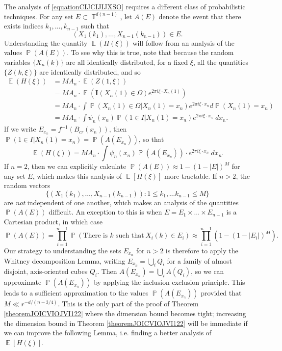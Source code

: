 \documentclass[dvipsnames,letterpaper,12pt]{article}
\numberwithin{equation}{section}
\DeclareMathOperator{\TT}{\mathbb{T}}
\numberwithin{theorem}{section}
\DeclareMathOperator{\EE}{\mathbb{E}}
\DeclareMathOperator{\PP}{\mathbb{P}}
\begin{document}
The analysis of \eqref{equationCIJCIJIJXSO} requires a different class of probabilistic techniques. For any set $E \subset \TT^{d(n-1)}$, let $A(E)$ denote the event that there exists indices $k_1,\dots, k_{n-1}$ such that
%
\[ (X_1(k_1), \dots, X_{n-1}(k_{n-1})) \in E. \]
%
Understanding the quantity $\EE(H(\xi))$ will follow from an analysis of the values $\PP(A(E))$. To see why this is true, note that because the random variables $\{ X_n(k) \}$ are all identically distributed, for a fixed $\xi$, all the quantities $\{ Z(k,\xi) \}$ are identically distributed, and so
%
\begin{align*}
    \EE(H(\xi)) &= M A_n \cdot \EE(Z(1,\xi))\\
    &= M A_n \cdot \EE( \mathbf{I}(X_n(1) \in \Omega) e^{2 \pi i \xi \cdot X_n(1)} )\\
    &= M A_n \cdot \int \PP(X_n(1) \in \Omega | X_n(1) = x_n) e^{2 \pi i \xi \cdot x_n} d\PP(X_n(1) = x_n)\\
    &= M A_n \cdot \int \psi_n(x_n) \PP(1 \in I | X_n(1) = x_n) e^{2 \pi i \xi \cdot x_n}\; dx_n.
\end{align*}
%
If we write $E_{x_n} = f^{-1}(B_{cr}(x_n))$, then $\PP(1 \in I | X_n(1) = x_n) = \PP(A(E_{x_n}))$, so that
%
\begin{equation} \label{ejowiajeoijo1ij2312j}
    \EE(H(\xi)) = MA_n \cdot \int \psi_n(x_n) \PP(A(E_{x_n})) \cdot e^{2 \pi i \xi \cdot x_n}\; dx_n.
\end{equation}
%
If $n = 2$, then we can explicitly calculate $\PP(A(E)) \approx 1 - (1 - |E|)^M$ for any set $E$, which makes this analysis of $\EE[H(\xi)]$ more tractable. If $n > 2$, the random vectors
%
\[ \{ (X_1(k_1), \dots, X_{n-1}(k_{n-1})) : 1 \leq k_1, \dots k_{n-1} \leq M \} \]
%
are \emph{not} independent of one another, which makes an analysis of the quantities $\PP(A(E))$ difficult. An exception to this is when $E = E_1 \times \dots \times E_{n-1}$ is a Cartesian product, in which case
%
\[ \PP(A(E)) = \prod_{i = 1}^{n-1} \PP(\text{There is $k$ such that}\ X_i(k) \in E_i) \approx \prod_{i = 1}^{n-1} (1 - (1 - |E_i|)^M). \]
%
Our strategy to understanding the sets $E_{x_n}$ for $n > 2$ is therefore to apply the Whitney decomposition Lemma, writing $E_{x_n} = \bigcup_i Q_i$ for a family of almost disjoint, axis-oriented cubes $Q_i$. Then $A(E_{x_n}) = \bigcup_i A(Q_i)$, so we can approximate $\PP(A(E_{x_n}))$ by applying the inclusion-exclusion principle. This leads to a sufficient approximation to the values $\PP(A(E_{x_n}))$ provided that $M \ll r^{-d/(n-3/4)}$. This is the only part of the proof of Theorem \ref{theoremJOICVIOJVI122} where the dimension bound becomes tight; increasing the dimension bound in Theorem \ref{theoremJOICVIOJVI122} will be immediate if we can improve the following Lemma, i.e. finding a better analysis of $\EE[H(\xi)]$.
\end{document}
